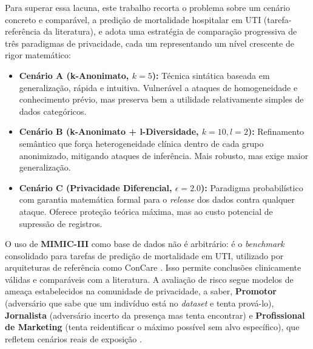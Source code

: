 Para superar essa lacuna, este trabalho recorta o problema sobre um cenário concreto e comparável, a predição de mortalidade hospitalar em UTI (tarefa-referência da literatura), e adota uma estratégia de comparação progressiva de três paradigmas de privacidade, cada um representando um nível crescente de rigor matemático:

\begin{itemize}
    \item \textbf{Cenário A (k-Anonimato, $k=5$):} Técnica sintática baseada em generalização, rápida e intuitiva. Vulnerável a ataques de homogeneidade e conhecimento prévio, mas preserva bem a utilidade relativamente simples de dados categóricos.
    \item \textbf{Cenário B (k-Anonimato + l-Diversidade, $k=10, l=2$):} Refinamento semântico que força heterogeneidade clínica dentro de cada grupo anonimizado, mitigando ataques de inferência. Mais robusto, mas exige maior generalização.
    \item \textbf{Cenário C (Privacidade Diferencial, $\epsilon=2.0$):} Paradigma probabilístico com garantia matemática formal para o \textit{release} dos dados contra qualquer ataque. Oferece proteção teórica máxima, mas ao custo potencial de supressão de registros.
\end{itemize}

O uso de \textbf{MIMIC-III} como base de dados não é arbitrário: é o \textit{benchmark} consolidado para tarefas de predição de mortalidade em UTI, utilizado por arquiteturas de referência como ConCare \cite{Ma2020, Harutyunyan2019}. Isso permite conclusões clinicamente válidas e comparáveis com a literatura. A avaliação de risco segue modelos de ameaça estabelecidos na comunidade de privacidade, a saber, \textbf{Promotor} (adversário que sabe que um indivíduo está no \textit{dataset} e tenta prová-lo), \textbf{Jornalista} (adversário incerto da presença mas tenta encontrar) e \textbf{Profissional de Marketing} (tenta reidentificar o máximo possível sem alvo específico), que refletem cenários reais de exposição \cite{ElEmam2011, ElEmam2013}.

